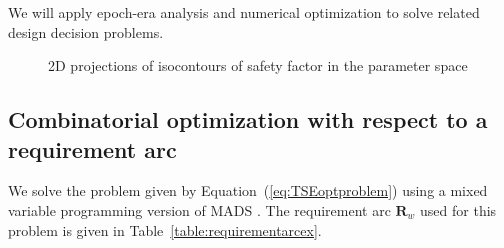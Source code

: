 We will apply epoch-era analysis and numerical optimization to solve related design decision problems.

\begin{figure}[h!]
	\centering
	
	\caption{2D projections of isocontours of safety factor in the parameter space}
	\label{fig:4Dexamplepspace}
\end{figure}

\subsection{Combinatorial optimization with respect to a requirement arc} \label{subsec:exampleoptprob}

We solve the problem given by Equation~(\ref{eq:TSEoptproblem}) using a mixed variable programming version of \ac{MADS} \cite{Abramson2009}. The requirement arc $\mathbf{R}_w$ used for this problem is given in Table~\ref{table:requirementarcex}.

